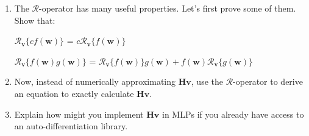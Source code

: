 \begin{enumerate}[resume] 

\item The $\mathcal{R}$-operator has many useful properties. Let's first prove some of them. Show that: 

\begin{center}
    $\mathcal{R}_{\mathbf{v}}\{cf(\mathbf{w})\}$ = $c\mathcal{R}_{\mathbf{v}}\{f(\mathbf{w})\}$ \qquad \qquad \qquad {}
    

    $\mathcal{R}_{\mathbf{v}}\{f(\mathbf{w})g(\mathbf{w})\}$ = $\mathcal{R}_{\mathbf{v}}\{f(\mathbf{w})\}g(\mathbf{w}) + f(\mathbf{w})\mathcal{R}_{\mathbf{v}}\{g(\mathbf{w})\}$ 

\end{center}


\item Now, instead of numerically approximating $\mathbf{H}\mathbf{v}$, use the $\mathcal{R}$-operator to derive an equation to exactly calculate $\mathbf{H}\mathbf{v}$.

\item Explain how might you implement $\mathbf{H}\mathbf{v}$ in MLPs if you already have access to an auto-differentiation library. 
\end{enumerate}